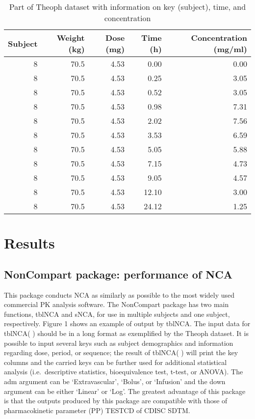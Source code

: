 \documentclass[12pt,]{krantz}
\theoremstyle{definition}
\theoremstyle{definition}
\theoremstyle{definition}
\theoremstyle{remark}
\begin{document}
\begin{table}

\caption{\label{tab:table2}Part of Theoph dataset with information on key (subject),
time, and concentration}
\centering
\begin{tabular}[t]{r|r|r|r|r}
\hline
Subject & Weight (kg) & Dose (mg) & Time (h) & Concentration (mg/ml)\\
\hline
8 & 70.5 & 4.53 & 0.00 & 0.00\\
\hline
8 & 70.5 & 4.53 & 0.25 & 3.05\\
\hline
8 & 70.5 & 4.53 & 0.52 & 3.05\\
\hline
8 & 70.5 & 4.53 & 0.98 & 7.31\\
\hline
8 & 70.5 & 4.53 & 2.02 & 7.56\\
\hline
8 & 70.5 & 4.53 & 3.53 & 6.59\\
\hline
8 & 70.5 & 4.53 & 5.05 & 5.88\\
\hline
8 & 70.5 & 4.53 & 7.15 & 4.73\\
\hline
8 & 70.5 & 4.53 & 9.05 & 4.57\\
\hline
8 & 70.5 & 4.53 & 12.10 & 3.00\\
\hline
8 & 70.5 & 4.53 & 24.12 & 1.25\\
\hline
\end{tabular}
\end{table}

\chapter{Results}\label{results}

\section{NonCompart package: performance of
NCA}\label{noncompart-package-performance-of-nca}

This package conducts NCA as similarly as possible to the most widely
used commercial PK analysis software. The NonCompart package has two
main functions, tblNCA and sNCA, for use in multiple subjects and one
subject, respectively. Figure 1 shows an example of output by tblNCA.
The input data for tblNCA( ) should be in a long format as exemplified
by the Theoph dataset. It is possible to input several keys such as
subject demographics and information regarding dose, period, or
sequence; the result of tblNCA( ) will print the key columns and the
carried keys can be further used for additional statistical analysis
(i.e.~descriptive statistics, bioequivalence test, t-test, or ANOVA).
The adm argument can be `Extravascular', `Bolus', or `Infusion' and the
down argument can be either `Linear' or `Log'. The greatest advantage of
this package is that the outputs produced by this package are compatible
with those of pharmacokinetic parameter (PP) TESTCD of CDISC SDTM.
\end{document}
